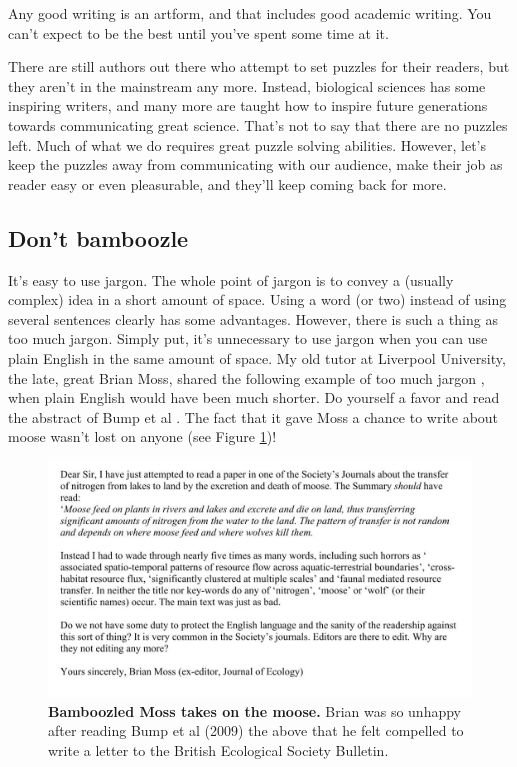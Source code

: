 \documentclass[
]{krantz}
\begin{document}
Any good writing is an artform, and that includes good academic writing. You can't expect to be the best until you've spent some time at it.

There are still authors out there who attempt to set puzzles for their readers, but they aren't in the mainstream any more. Instead, biological sciences has some inspiring writers, and many more are taught how to inspire future generations towards communicating great science. That's not to say that there are no puzzles left. Much of what we do requires great puzzle solving abilities. However, let's keep the puzzles away from communicating with our audience, make their job as reader easy or even pleasurable, and they'll keep coming back for more.

\hypertarget{dont-bamboozle}{%
\subsection{Don't bamboozle}\label{dont-bamboozle}}

It's easy to use jargon. The whole point of jargon is to convey a (usually complex) idea in a short amount of space. Using a word (or two) instead of using several sentences clearly has some advantages. However, there is such a thing as too much jargon. Simply put, it's unnecessary to use jargon when you can use plain English in the same amount of space. My old tutor at Liverpool University, the late, great Brian Moss, shared the following example of too much jargon \citep{bump2009large}, when plain English would have been much shorter. Do yourself a favor and read the abstract of Bump et al \citeyearpar{bump2009large}. The fact that it gave Moss a chance to write about moose wasn't lost on anyone (see Figure \ref{fig:moss})!



\begin{figure}
\includegraphics[width=0.95\linewidth]{figures/moss} \caption{\textbf{Bamboozled Moss takes on the moose.} Brian was so unhappy after reading Bump et al (2009) the above that he felt compelled to write a letter to the British Ecological Society Bulletin.}\label{fig:moss}
\end{figure}
\end{document}

